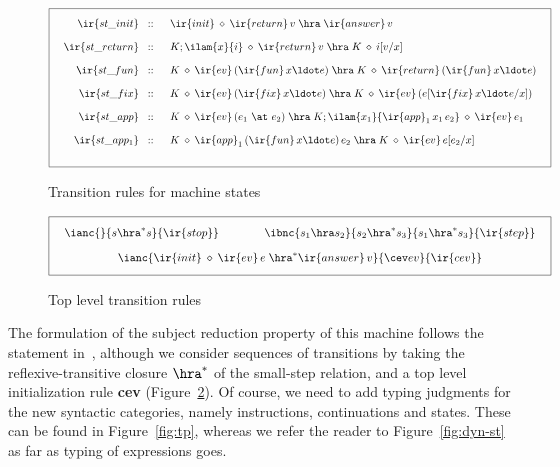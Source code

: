 \documentclass[final]{svjour3}
\begin{document}
\begin{figure}[t]
  \centering
  \[\fboxsep=3mm\fbox{$\begin{array}{rl}
\ir{st\_init} \;\;::\;\; & \ir{init}\:\diamond\:\ir{return}\,v \;\hra\;\ir{answer}\,v
\\[1em] 
\ir{st\_return} \;\;::\;\; & K;\ilam{x}{i}\:\diamond\:\ir{return}\,v 
\;\hra\; K\:\diamond\:i[v/x]
\\[1em]
\ir{st\_fun} \;\;::\;\; & K\:\diamond\:\ir{ev}\,(\ir{fun}\,x\ldot e) \;\hra\; 
K\:\diamond\: \ir{return}\,(\ir{fun}\, x\ldot e)
\\[1em]
\ir{st\_fix} \;\;::\;\; & K\:\diamond\:\ir{ev}\,(\ir{fix}\,x\ldot e) \;\hra\; 
K\:\diamond\: \ir{ev}\,(e[\ir{fix}\, x\ldot e/x])
\\[1em]
\ir{st\_app} \;\;::\;\; & K\:\diamond\:\ir{ev}\,(e_1\ \at\ e_2) \;\hra\; 
K;\ilam{x_1}{\ir{app}_1\,x_1\,e_2} \:\diamond\: \ir{ev}\,e_1
\\[1em]
\ir{st\_app_1} \;\;::\;\; & K\:\diamond\: \ir{app}_1\,(\ir{fun}\,x\ldot e)\,e_2 \;\hra\; 
K \:\diamond\: \ir{ev}\,e[e_2/x]\\[1em]
\end{array}
$}\]
  \caption{Transition rules for machine states}
  \label{fig:Kopsem}
\end{figure}

\begin{figure}[t]
  \centering
  \[\fboxsep=3mm\fbox{$ \begin{array}{c}
      \ianc{}{s \hra^* s}{\ir {stop}}\qquad\qquad
      \ibnc{s_1 \hra s_2}{s_2 \hra^* s_3}{s_1 \hra^* s_3}{\ir {step}}\\[1em]
      \ianc{\ir{init}\:\diamond\:\ir{ev}\,e \;\hra^*\ir{answer}\,v}
{\cev        e v }{\ir {cev}}
\end{array}$}\]
  \caption{Top level transition rules}
  \label{fig:cev}
\end{figure}

The formulation of the subject reduction property of this machine
follows the statement in~\cite{CervesatoP02}, although we consider
sequences of transitions by taking the reflexive-transitive closure
$\hra^*$ of the small-step relation, and a top level initialization
rule \textbf{cev} (Figure~\ref{fig:cev}).  Of course, we need to add
typing judgments for the new syntactic categories, namely
instructions, continuations and states. These can be found in
Figure~\ref{fig:tp}, whereas we refer the reader to
Figure~\ref{fig:dyn-st} as far as typing of expressions goes.
\end{document}
